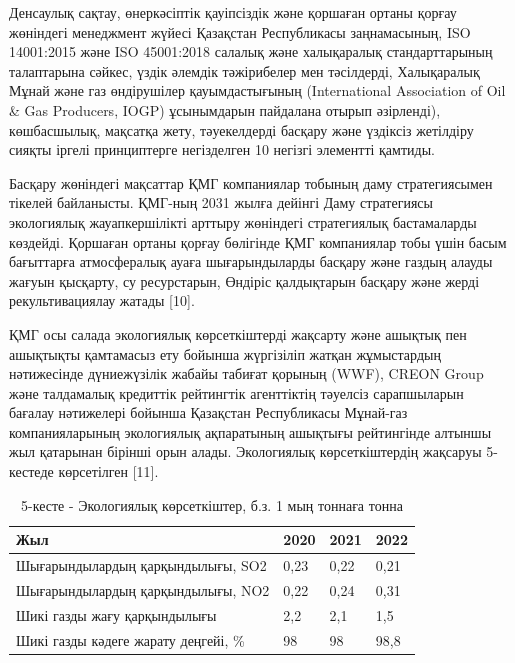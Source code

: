 \begin{multicols}{2}
Денсаулық сақтау, өнеркәсіптік қауіпсіздік және қоршаған ортаны қорғау
жөніндегі менеджмент жүйесі Қазақстан Республикасы заңнамасының, ISO
14001:2015 және ISO 45001:2018 салалық және халықаралық стандарттарының
талаптарына сәйкес, үздік әлемдік тәжірибелер мен тәсілдерді,
Халықаралық Мұнай және газ өндірушілер қауымдастығының (International
Association of Oil \& Gas Producers, IOGP) ұсынымдарын пайдалана отырып
әзірленді), көшбасшылық, мақсатқа жету, тәуекелдерді басқару және
үздіксіз жетілдіру сияқты іргелі принциптерге негізделген 10 негізгі
элементті қамтиды.

Басқару жөніндегі мақсаттар ҚМГ компаниялар тобының даму стратегиясымен
тікелей байланысты. ҚМГ-ның 2031 жылға дейінгі Даму стратегиясы
экологиялық жауапкершілікті арттыру жөніндегі стратегиялық бастамаларды
көздейді. Қоршаған ортаны қорғау бөлігінде ҚМГ компаниялар тобы үшін
басым бағыттарға атмосфералық ауаға шығарындыларды басқару және газдың
алауды жағуын қысқарту, су ресурстарын, Өндіріс қалдықтарын басқару және
жерді рекультивациялау жатады {[}10{]}.

ҚМГ осы салада экологиялық көрсеткіштерді жақсарту және ашықтық пен
ашықтықты қамтамасыз ету бойынша жүргізіліп жатқан жұмыстардың
нәтижесінде дүниежүзілік жабайы табиғат қорының (WWF), CREON Group және
талдамалық кредиттік рейтингтік агенттіктің тәуелсіз сарапшыларын
бағалау нәтижелері бойынша Қазақстан Республикасы Мұнай-газ
компанияларының экологиялық ақпаратының ашықтығы рейтингінде алтыншы жыл
қатарынан бірінші орын алады. Экологиялық көрсеткіштердің жақсаруы
5-кестеде көрсетілген {[}11{]}.
\end{multicols}

\begin{table}[H]
\caption*{5-кесте - Экологиялық көрсеткіштер, б.з. 1 мың тоннаға тонна}
\centering
\begin{tabular}{|l|l|l|l|}
\hline
Жыл & 2020 & 2021 & 2022 \\ \hline
Шығарындылардың қарқындылығы, SO2 & 0,23 & 0,22 & 0,21 \\ \hline
Шығарындылардың қарқындылығы, NO2 & 0,22 & 0,24 & 0,31 \\ \hline
Шикі газды жағу қарқындылығы & 2,2 & 2,1 & 1,5 \\ \hline
Шикі газды кәдеге жарату деңгейі, \% & 98 & 98 & 98,8 \\ \hline
\end{tabular}
\end{table}


